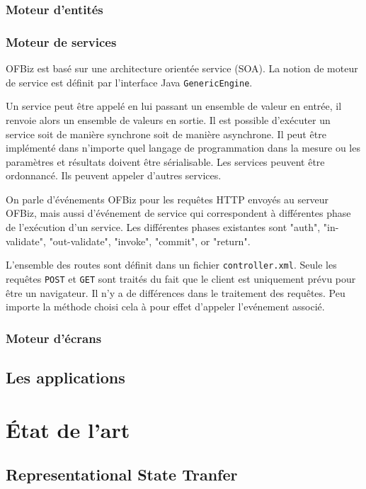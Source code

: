 \documentclass[a4paper, 11pt]{report}
\begin{document}
\subsection{Moteur d'entités}
\subsection{Moteur de services}

OFBiz est basé sur une architecture orientée service (SOA).  La notion
de moteur de service est définit par l'interface Java
\verb=GenericEngine=.

Un service peut être appelé en lui passant un ensemble de valeur en
entrée, il renvoie alors un ensemble de valeurs en sortie.  Il est
possible d'exécuter un service soit de manière synchrone soit de
manière asynchrone.  Il peut être implémenté dans n'importe quel
langage de programmation dans la mesure ou les paramètres et résultats
doivent être sérialisable.  Les services peuvent être ordonnancé.  Ils
peuvent appeler d'autres services.

On parle d'événements OFBiz pour les requêtes HTTP envoyés au serveur
OFBiz, mais aussi d'événement de service qui correspondent à
différentes phase de l'exécution d'un service.  Les différentes phases
existantes sont "auth", "in-validate", "out-validate", "invoke",
"commit", or "return".

L'ensemble des routes sont définit dans un fichier
\verb=controller.xml=.  Seule les requêtes \verb=POST= et \verb=GET=
sont traités du fait que le client est uniquement prévu pour être un
navigateur.  Il n'y a de différences dans le traitement des requêtes.
Peu importe la méthode choisi cela à pour effet d'appeler l'evénement
associé.

\subsection{Moteur d'écrans}

\section{Les applications}

\chapter{État de l'art}

\section{Representational State Tranfer}
\end{document}
